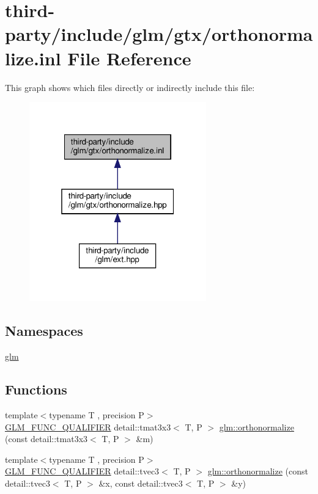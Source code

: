 \hypertarget{orthonormalize_8inl}{}\section{third-\/party/include/glm/gtx/orthonormalize.inl File Reference}
\label{orthonormalize_8inl}
This graph shows which files directly or indirectly include this file\+:
\nopagebreak
\begin{figure}[H]
\begin{center}
\leavevmode
\includegraphics[width=217pt]{orthonormalize_8inl__dep__incl}
\end{center}
\end{figure}
\subsection*{Namespaces}
\begin{DoxyCompactItemize}
\item 
 \hyperlink{namespaceglm}{glm}
\end{DoxyCompactItemize}
\subsection*{Functions}
\begin{DoxyCompactItemize}
\item 
{\footnotesize template$<$typename T , precision P$>$ }\\\hyperlink{setup_8hpp_a33fdea6f91c5f834105f7415e2a64407}{G\+L\+M\+\_\+\+F\+U\+N\+C\+\_\+\+Q\+U\+A\+L\+I\+F\+I\+ER} detail\+::tmat3x3$<$ T, P $>$ \hyperlink{group__gtx__orthonormalize_ga2d615d8b740d7d11e583651c34103e40}{glm\+::orthonormalize} (const detail\+::tmat3x3$<$ T, P $>$ \&m)
\item 
{\footnotesize template$<$typename T , precision P$>$ }\\\hyperlink{setup_8hpp_a33fdea6f91c5f834105f7415e2a64407}{G\+L\+M\+\_\+\+F\+U\+N\+C\+\_\+\+Q\+U\+A\+L\+I\+F\+I\+ER} detail\+::tvec3$<$ T, P $>$ \hyperlink{group__gtx__orthonormalize_ga41d176cb31fda91b672655c839084b43}{glm\+::orthonormalize} (const detail\+::tvec3$<$ T, P $>$ \&x, const detail\+::tvec3$<$ T, P $>$ \&y)
\end{DoxyCompactItemize}
